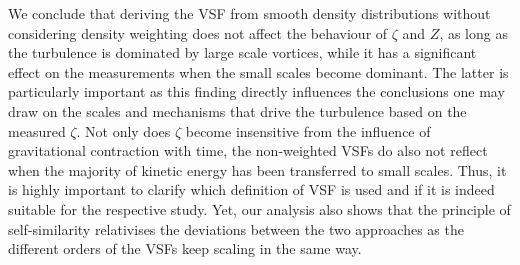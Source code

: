 We conclude that deriving the VSF from smooth density distributions without considering density weighting does not affect the behaviour of $\zeta$ and $Z$, as long as the turbulence is dominated by large scale vortices, while it has a significant effect on the measurements when the small scales become dominant.
The latter is particularly important as this finding directly influences the conclusions one may draw on the scales and mechanisms that drive the turbulence based on the measured $\zeta$.
Not only does $\zeta$ become insensitive from the influence of gravitational contraction with time, the non-weighted VSFs do also not reflect when the majority of kinetic energy has been transferred to small scales. 
Thus, it is highly important to clarify which definition of VSF is used and if it is indeed suitable for the respective study.
Yet, our analysis also shows that the principle of self-similarity relativises the deviations between the two approaches as the different orders of the VSFs keep scaling in the same way. 














